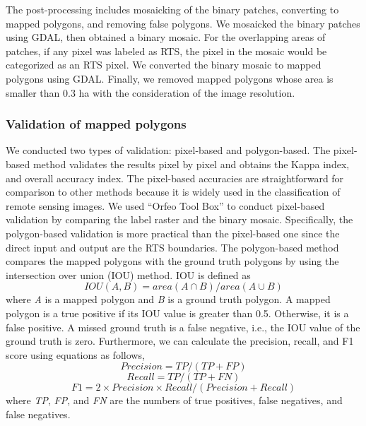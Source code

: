 \documentclass[preprint,12pt,authoryear]{elsarticle}
\begin{document}
The post-processing includes mosaicking of the binary patches, converting to mapped polygons, and removing false polygons. We mosaicked the binary patches using GDAL, then obtained a binary mosaic. For the overlapping areas of patches, if any pixel was labeled as RTS, the pixel in the mosaic would be categorized as an RTS pixel. We converted the binary mosaic to mapped polygons using GDAL. Finally, we removed mapped polygons whose area is smaller than 0.3 ha with the consideration of the image resolution.  

\subsubsection{Validation of mapped polygons}
\label{subsubsec_validation}

We conducted two types of validation: pixel-based and polygon-based. The pixel-based method validates the results pixel by pixel and obtains the Kappa index, and overall accuracy index. The pixel-based accuracies are straightforward for comparison to other methods because it is widely used in the classification of remote sensing images. We used ``Orfeo Tool Box'' \citep{inglada2009orfeo} to conduct pixel-based validation by comparing the label raster and the binary mosaic. Specifically, the polygon-based validation is more practical than the pixel-based one since the direct input and output are the RTS boundaries. The polygon-based method compares the mapped polygons with the ground truth polygons by using the intersection over union (IOU) method.  IOU is defined as 
\begin{equation}
IOU(A,B)=area(A \cap B)/area(A \cup B)
\label{equ_iou}
\end{equation}
where \emph{A} is a mapped polygon and \emph{B} is a ground truth polygon. A mapped polygon is a true positive if its IOU value is greater than 0.5. Otherwise, it is a false positive. A missed ground truth is a false negative, i.e., the IOU value of the ground truth is zero. Furthermore, we can calculate the precision, recall, and F1 score using equations as follows,
\begin{equation}
Precision=TP/(TP+FP)
\label{equ_precision}
\end{equation}
\begin{equation}
Recall=TP/(TP+FN)
\label{equ_recall}
\end{equation}
\begin{equation}
F1=2 \times Precision \times Recall / (Precision + Recall)
\label{equ_f1score}
\end{equation}
where \emph{TP}, \emph{FP}, and \emph{FN} are the numbers of true positives, false negatives, and false negatives. 
\end{document}
